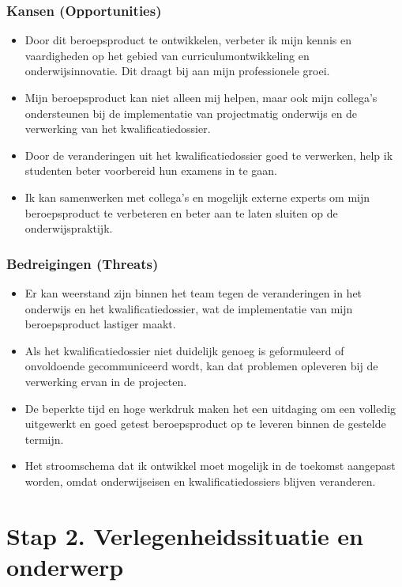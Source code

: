 \subsubsection{Kansen (Opportunities)}
\begin{itemize}
    \item Door dit beroepsproduct te ontwikkelen, verbeter ik mijn kennis en vaardigheden op het gebied van curriculumontwikkeling en onderwijsinnovatie. Dit draagt bij aan mijn professionele groei.
    \item Mijn beroepsproduct kan niet alleen mij helpen, maar ook mijn collega's
 ondersteunen bij de implementatie van projectmatig onderwijs en de verwerking van het kwalificatiedossier.
    \item Door de veranderingen uit het kwalificatiedossier goed te verwerken, help ik studenten beter voorbereid hun examens in te gaan.
    \item Ik kan samenwerken met collega's
 en mogelijk externe experts om mijn beroepsproduct te verbeteren en beter aan te laten sluiten op de onderwijspraktijk.
\end{itemize}


\subsubsection{Bedreigingen (Threats)}
\begin{itemize}
    \item Er kan weerstand zijn binnen het team tegen de veranderingen in het onderwijs en het kwalificatiedossier, wat de implementatie van mijn beroepsproduct lastiger maakt.
    \item Als het kwalificatiedossier niet duidelijk genoeg is geformuleerd of onvoldoende gecommuniceerd wordt, kan dat problemen opleveren bij de verwerking ervan in de projecten.
    \item De beperkte tijd en hoge werkdruk maken het een uitdaging om een volledig uitgewerkt en goed getest beroepsproduct op te leveren binnen de gestelde termijn.
    \item Het stroomschema dat ik ontwikkel moet mogelijk in de toekomst aangepast worden, omdat onderwijseisen en kwalificatiedossiers blijven veranderen.
\end{itemize}

\section{Stap 2. Verlegenheidssituatie en onderwerp}

